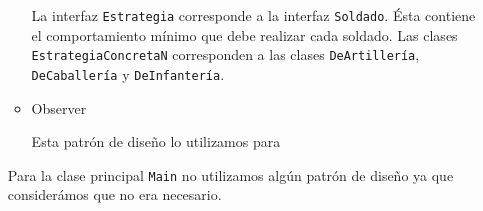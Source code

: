 \documentclass[letterpaper,11pt]{article}
\begin{document}
\begin{enumerate}
\begin{itemize}
        La interfaz \texttt{Estrategia} corresponde a la interfaz 
        \texttt{Soldado}. Ésta contiene el comportamiento mínimo que debe 
        realizar cada soldado. Las clases \texttt{EstrategiaConcretaN}
        corresponden a las clases \texttt{DeArtillería}, \texttt{DeCaballería}
        y \texttt{DeInfantería}. 

        \item Observer 

        Esta patrón de diseño lo utilizamos para 
    \end{itemize}

    Para la clase principal \texttt{Main} no utilizamos algún patrón de diseño 
    ya que considerámos que no era necesario.
\end{enumerate}
\end{document}
